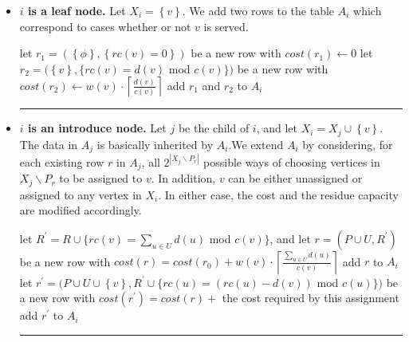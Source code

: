 \documentclass[a4paper,11pt]{article}
\theoremstyle{definition}
\begin{document}
\begin{itemize}
\item{\bf $i$ is a leaf node.} Let $X_i = \left\{v\right\}$. We add two rows to the table $A_i$ which correspond to cases whether or not $v$ is served.

\smallskip

\begin{algorithmic}[1]
\STATE let $r_1 = (\left\{ \phi \right\}, \left\{rc(v)=0\right\})$ be a new row with $cost(r_1) \longleftarrow 0$
	\STATE let $r_2 = (\left\{v\right\}, \{rc(v)=d(v)$ mod $c(v)\})$ be a new row with $cost(r_2) \longleftarrow w(v) \cdot \left\lceil \frac{d(v)}{c(v)} \right\rceil$
	\STATE add $r_1$ and $r_2$ to $A_i$
	\newline \rule{\linewidth}{0.2mm}
\end{algorithmic}

\item{\bf $i$ is an introduce node.} Let $j$ be the child of $i$, and let $X_i = X_j \cup \left\{v\right\}$. The data in $A_j$ is basically inherited by $A_i$.We extend $A_i$ by considering, for each existing row $r$ in $A_j$, all $2^{\left|X_j \backslash P_r\right|}$ possible ways of choosing vertices in $X_j \backslash P_r$ to be assigned to $v$. In addition, $v$ can be either unassigned or assigned to any vertex in $X_i$. In either case, the cost and the residue capacity are modified accordingly. 

\smallskip

\begin{algorithmic}[1]
        \STATE let $R^\prime = R \cup \{ rc(v) = \sum_{u \in U}d(u)$ mod $c(v) \}$, and
        \newline let $r = (P \cup U, R^\prime)$ be a new row with
        \newline $cost(r) = cost(r_0) + w(v) \cdot \left\lceil \frac{\sum_{u \in U}d(u)}{c(v)} \right\rceil$
        \STATE add $r$ to $A_i$
            \STATE let $r^\prime = (P \cup U \cup \left\{v\right\}, R^\prime \cup \{rc(u) = (rc(u) - d(v))$ mod $c(u)\})$ be a new row with
            \newline $cost(r^\prime) = cost(r) +$ the cost required by this assignment
            \STATE add $r^\prime$ to $A_i$
        \ENDFOR
    \ENDFOR
\ENDFOR
\newline \rule{\linewidth}{0.2mm}
\end{algorithmic}


\end{itemize}
\end{document}
